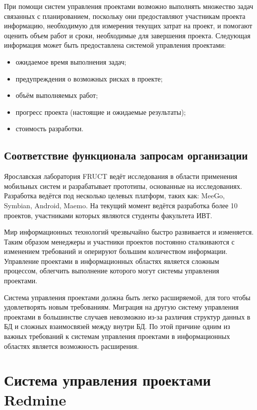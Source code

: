 При помощи систем управления проектами возможно выполнять множество задач
связанных с планированием, поскольку они предоставляют участникам проекта
информацию, необходимую для измерения текущих затрат на проект, и помогают
оценить объем работ и сроки, необходимые для завершения проекта. Следующая
информация может быть предоставлена системой управления проектами:
\begin{itemize}
  \item ожидаемое время выполнения задач;
  \item предупреждения о возможных рисках в проекте;
  \item объём выполняемых работ;
  \item прогресс проекта (настоящие и ожидаемые результаты);
  \item стоимость разработки.
\end{itemize}

\subsection{Соответствие функционала запросам организации}
Ярославская лаборатория FRUCT \cite{yarfruct} ведёт исследования в области
применения мобильных систем и разрабатывает прототипы, основанные на
исследованиях. Разработка ведётся под несколько целевых платформ, таких как:
MeeGo, Symbian, Android, Maemo. На текущий момент ведётся разработка более 10
проектов, участниками которых являются студенты факультета ИВТ.

Мир информационных технологий чрезвычайно быстро развивается и изменяется.
Таким образом менеджеры и участники проектов постоянно сталкиваются с
изменением требований и оперируют большим количеством информации. Управление
проектами в информационных областях является сложным процессом, облегчить
выполнение которого могут системы управления проектами.

Система управления проектами должна быть легко расширяемой, для того чтобы
удовлетворять новым требованиям. Миграция на другую систему управления
проектами в большинстве случаев невозможно из-за различия структур данных в БД
и сложных взаимосвязей между внутри БД. По этой причине одним из важных
требований к системам управления проектами в информационных областях является
возможность расширения.

\section{Система управления проектами Redmine}

